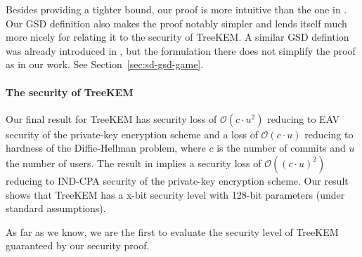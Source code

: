 Besides providing a tighter bound, our proof is more intuitive than the one in \cite{ttkem}. Our GSD definition also makes the proof notably simpler and lends itself much more nicely for relating it to the security of TreeKEM. A similar GSD defintion was already introduced in \cite{modular-group-messaging}, but the formulation there does not simplify the proof as in our work. See Section~\ref{sec:sd-gsd-game}.

\paragraph{The security of TreeKEM} Our final result for TreeKEM has security loss of $\mathcal{O}(c \cdot u^2)$ reducing to EAV security of the private-key encryption scheme and a loss of $\mathcal{O}(c \cdot u)$ reducing to hardness of the Diffie-Hellman problem, where $c$ is the number of commits and $u$ the number of users. The result in \cite{ttkem} implies a security loss of $\mathcal{O}((c \cdot u)^2)$ reducing to IND-CPA security of the private-key encryption scheme. Our result shows that TreeKEM has a x-bit security level with 128-bit parameters (under standard assumptions).

As far as we know, we are the first to evaluate the security level of TreeKEM guaranteed by our security proof.
